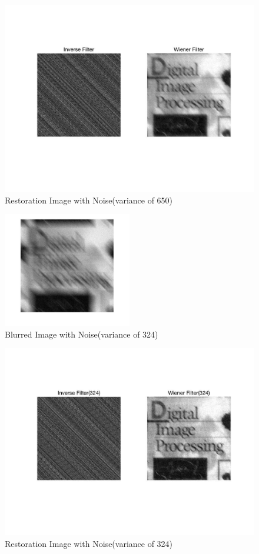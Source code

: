 \documentclass[11pt,oneside]{book}
\begin{document}
\begin{figure}[!htb]
   \centering  
   \includegraphics[width=1\textwidth]{images/5/650.jpg}
   \caption{Restoration Image with Noise(variance of 650)}
\end{figure}

\begin{figure}[!htb]
   \centering  
   \includegraphics[width=0.5\textwidth]{images/5/324_.jpg}
   \caption{Blurred Image with Noise(variance of 324)}
\end{figure}

\begin{figure}[!htb]
   \centering  
   \includegraphics[width=1\textwidth]{images/5/324.jpg}
   \caption{Restoration Image with Noise(variance of 324)}
\end{figure}
\end{document}
